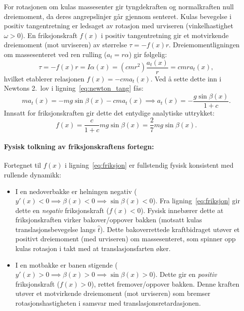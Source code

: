 \documentclass[11pt,a4paper]{article}
\begin{document}
For rotasjonen om kulas massesenter gir tyngdekraften og normalkraften null dreiemoment, da deres angrepslinjer går gjennom senteret. Kulas bevegelse i positiv tangentretning er ledsaget av rotasjon med urviseren (vinkelhastighet $\omega > 0$). En friksjonskraft $f(x)$ i positiv tangentretning gir et motvirkende dreiemoment (mot urviseren) av størrelse $\tau = -f(x) r$. Dreiemomentligningen om massesenteret ved ren rulling ($a_t = r\alpha$) gir følgelig:
\begin{equation}
    \tau = -f(x) r = I \alpha(x) = (c m r^2)\frac{a_t(x)}{r} = c m r a_t(x),
\end{equation}
hvilket etablerer relasjonen $f(x) = -c m a_t(x)$. Ved å sette dette inn i Newtons 2.~lov i ligning~\eqref{eq:newton_tang} fås:
\begin{equation}
    m a_t(x) = -mg\sin\beta(x) - c m a_t(x) \implies a_t(x) = -\frac{g\sin\beta(x)}{1 + c}.
\end{equation}
Innsatt for friksjonskraften gir dette det entydige analytiske uttrykket:
\begin{equation}
    \boxed{f(x) = \frac{c}{1 + c}mg\sin\beta(x) = \frac{2}{7}mg\sin\beta(x)}.
    \label{eq:friksjon}
\end{equation}

\paragraph{Fysisk tolkning av friksjonskraftens fortegn:}
Fortegnet til $f(x)$ i ligning~\eqref{eq:friksjon} er fullstendig fysisk konsistent med rullende dynamikk:
\begin{itemize}
    \item I en nedoverbakke er helningen negativ ($y'(x) < 0 \implies \beta(x) < 0 \implies \sin\beta(x) < 0$). Fra ligning~\eqref{eq:friksjon} gir dette en \emph{negativ} friksjonskraft ($f(x) < 0$). Fysisk innebærer dette at friksjonskraften virker bakover/oppover bakken (motsatt kulas translasjonsbevegelse langs $\hat{t}$). Dette bakoverrettede kraftbidraget utøver et positivt dreiemoment (med urviseren) om massesenteret, som spinner opp kulas rotasjon i takt med at translasjonsfarten øker.
    \item I en motbakke er banen stigende ($y'(x) > 0 \implies \beta(x) > 0 \implies \sin\beta(x) > 0$). Dette gir en \emph{positiv} friksjonskraft ($f(x) > 0$), rettet fremover/oppover bakken. Denne kraften utøver et motvirkende dreiemoment (mot urviseren) som bremser rotasjonshastigheten i samsvar med translasjonsretardasjonen.
\end{itemize}
\end{document}

